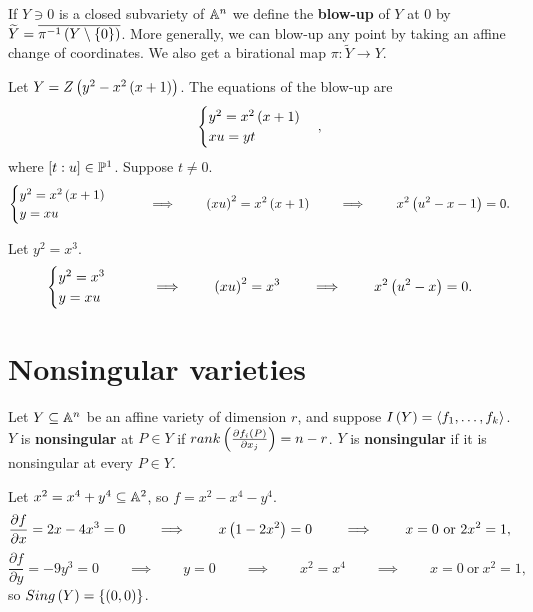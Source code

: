 \begin{definition}
If $ Y \ni 0 $ is a closed subvariety of $ \A^n $ we define the \textbf{blow-up} of $ Y $ at $ 0 $ by $ \widetilde{Y} = \overline{\pi^{-1}\rb{Y \setminus \cb{0}}} $. More generally, we can blow-up any point by taking an affine change of coordinates. We also get a birational map $ \pi : \widetilde{Y} \to Y $.
\end{definition}

\begin{example}
Let $ Y = Z\rb{y^2 - x^2\rb{x + 1}} $. The equations of the blow-up are
$$
\begin{cases}
y^2 = x^2\rb{x + 1} \\
xu = yt
\end{cases},
$$
where $ \sb{t : u} \in \P^1 $. Suppose $ t \ne 0 $.
$$
\begin{cases}
y^2 = x^2\rb{x + 1} \\
y = xu
\end{cases}
\qquad \implies \qquad \rb{xu}^2 = x^2\rb{x + 1} \qquad \implies \qquad x^2\rb{u^2 - x - 1} = 0.
$$
\end{example}

\begin{example}
Let $ y^2 = x^3 $.
$$
\begin{cases}
y^2 = x^3 \\
y = xu
\end{cases}
\qquad \implies \qquad \rb{xu}^2 = x^3 \qquad \implies \qquad x^2\rb{u^2 - x} = 0.
$$
\end{example}

\pagebreak

\section{Nonsingular varieties}


\begin{definition}
Let $ Y \subseteq \A^n $ be an affine variety of dimension $ r $, and suppose $ I\rb{Y} = \ab{f_1, \dots, f_k} $. $ Y $ is \textbf{nonsingular} at $ P \in Y $ if $ rank\rb{\tfrac{\partial f_i\rb{P}}{\partial x_j}} = n - r $. $ Y $ is \textbf{nonsingular} if it is nonsingular at every $ P \in Y $.
\end{definition}

\begin{example}
Let $ x^2 = x^4 + y^4 \subseteq \A^2 $, so $ f = x^2 - x^4 - y^4 $.
$$ \dfrac{\partial f}{\partial x} = 2x - 4x^3 = 0 \qquad \implies \qquad x\rb{1 - 2x^2} = 0 \qquad \implies \qquad x = 0 \ \text{or} \ 2x^2 = 1, $$
$$ \dfrac{\partial f}{\partial y} = -9y^3 = 0 \qquad \implies \qquad y = 0 \qquad \implies \qquad x^2 = x^4 \qquad \implies \qquad x = 0 \ \text{or} \ x^2 = 1, $$
so $ Sing\rb{Y} = \cb{\rb{0, 0}} $.
\end{example}

